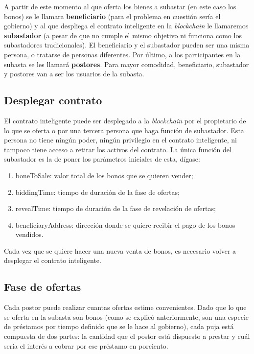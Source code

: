   A partir de este momento al que oferta los bienes a subastar (en este caso los bonos) se le llamara  \textbf{beneficiario} (para el problema en cuestión sería el gobierno) y al que despliega el contrato inteligente en la \textit{blockchain} le llamaremos \textbf{subastador} (a pesar de que no cumple el mismo objetivo ni funciona como los subastadores tradicionales). El beneficiario y el subastador pueden ser una misma persona, o tratarse de personas diferentes. Por último, a los participantes en la subasta se les llamará \textbf{postores}. Para mayor comodidad, beneficiario, subastador y postores van a ser los usuarios de la subasta.

  \subsection{Desplegar contrato}
    El contrato inteligente puede ser desplegado a la \textit{blockchain} por el propietario de lo que se oferta
    o por una tercera persona que haga función de subastador. Esta persona no tiene ningún poder, ningún
    privilegio en el contrato inteligente, ni tampoco tiene acceso a retirar los activos del contrato. La única función del subastador 
    es la de poner los parámetros iniciales de esta, dígase: 
  
    \begin{enumerate}
      \item boneToSale: valor total de los bonos que se quieren vender;
      \item biddingTime: tiempo de duración de la fase de ofertas;
      \item revealTime: tiempo de duración de la fase de revelación de ofertas;
      \item beneficiaryAddress: dirección donde se quiere recibir el pago de los bonos vendidos.
    \end{enumerate}

    Cada vez que se quiere hacer una nueva venta de bonos, es necesario volver a desplegar el contrato inteligente.

  \subsection{Fase de ofertas}
    Cada postor puede realizar cuantas ofertas estime convenientes. Dado que lo que se oferta en la subasta son bonos (como se explicó anteriormente, son una especie de préstamos por tiempo definido que se le hace al gobierno), cada puja está compuesta de dos partes: la cantidad que el postor está dispuesto a prestar y cuál sería el interés a cobrar por ese préstamo en porciento. 

